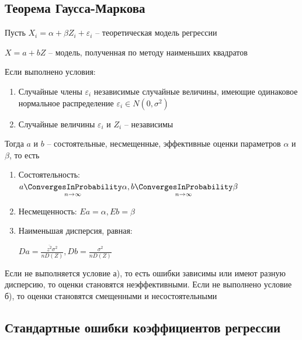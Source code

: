 \subsection{Теорема Гаусса-Маркова}

\hypertarget{gauss_markov_theorem}{}

\begin{MyTheorem}
    \Ths Пусть $X_i = \alpha + \beta Z_i + \varepsilon_i$ -- теоретическая модель регрессии

    $X = a + b Z$ -- модель, полученная по методу наименьших квадратов

    Если выполнено условия:

    \begin{enumerate}[label=\asbuk*),ref=\asbuk*]
        \item Случайные члены $\varepsilon_i$ независимые случайные величины, имеющие одинаковое нормальное распределение $\varepsilon_i \in N(0, \sigma^2)$
        \item Случайные величины $\varepsilon_i$ и $Z_i$ -- независимы
    \end{enumerate}

    Тогда $a$ и $b$ -- состоятельные, несмещенные, эффективные оценки параметров $\alpha$ и $\beta$, то есть

    \begin{enumerate}
        \item Состоятельность: $a \underset{n \to \infty}{\ConvergesInProbability} \alpha, b \underset{n \to \infty}{\ConvergesInProbability} \beta$
        \item Несмещенность: $Ea = \alpha, Eb = \beta$
        \item Наименьшая дисперсия, равная:

        $D a = \frac{\overline{z^2} \sigma^2}{n D(Z)}, Db = \frac{\sigma^2}{n D(Z)}$
    \end{enumerate}
\end{MyTheorem}

\Nota Если не выполняется условие а), то есть ошибки зависимы или имеют разную дисперсию, то оценки становятся неэффективными. 
Если не выполнено условие б), то оценки становятся смещенными и несостоятельными

\subsection{Стандартные ошибки коэффициентов регрессии}

\hypertarget{regression_coefficient_error}{}

